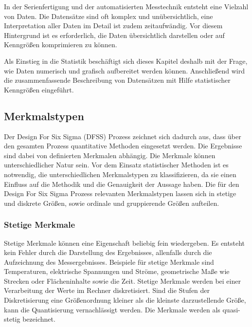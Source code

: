 \noindent In der Serienfertigung und der automatisierten Messtechnik entsteht eine Vielzahl von Daten. Die Datens\"{a}tze sind oft komplex und un\"{u}bersichtlich, eine Interpretation aller Daten im Detail ist zudem zeitaufw\"{a}ndig. Vor diesem Hintergrund ist es erforderlich, die Daten \"{u}bersichtlich darstellen oder auf Kenngr\"{o}{\ss}en komprimieren zu k\"{o}nnen.\newline

\noindent Als Einstieg in die Statistik besch\"{a}ftigt sich dieses Kapitel deshalb mit der Frage, wie Daten numerisch und grafisch aufbereitet werden k\"{o}nnen. Anschlie{\ss}end wird die zusammenfassende Beschreibung von Datens\"{a}tzen mit Hilfe statistischer Kenngr\"{o}{\ss}en eingef\"{u}hrt. 

\subsection{ Merkmalstypen}

\noindent Der Design For Six Sigma (DFSS) Prozess zeichnet sich dadurch aus, dass \"{u}ber den gesamten Prozess quantitative Methoden eingesetzt werden. Die Ergebnisse sind dabei von definierten Merkmalen abh\"{a}ngig. Die Merkmale k\"{o}nnen unterschiedlicher Natur sein. Vor dem Einsatz statistischer Methoden ist es notwendig, die unterschiedlichen Merkmalstypen zu klassifizieren, da sie einen Einfluss auf die Methodik und die Genauigkeit der Aussage haben. Die f\"{u}r den Design For Six Sigma Prozess relevanten Merkmalstypen lassen sich in stetige und diskrete Gr\"{o}{\ss}en, sowie ordinale und gruppierende Gr\"{o}{\ss}en aufteilen. 

\subsubsection{Stetige Merkmale}

\noindent Stetige Merkmale k\"{o}nnen eine Eigenschaft beliebig fein wiedergeben. Es entsteht kein Fehler durch die Darstellung des Ergebnisses, allenfalls durch die Aufzeichnung des Messergebnisses. Beispiele f\"{u}r stetige Merkmale sind Temperaturen, elektrische Spannungen und Str\"{o}me, geometrische Ma{\ss}e wie Strecken oder Fl\"{a}cheninhalte sowie die Zeit. Stetige Merkmale werden bei einer Verarbeitung der Werte im Rechner diskretisiert. Sind die Stufen der Diskretisierung eine Gr\"{o}{\ss}enordnung kleiner als die kleinste darzustellende Gr\"{o}{\ss}e, kann die Quantisierung vernachl\"{a}ssigt werden. Die Merkmale werden als quasi-stetig bezeichnet.


